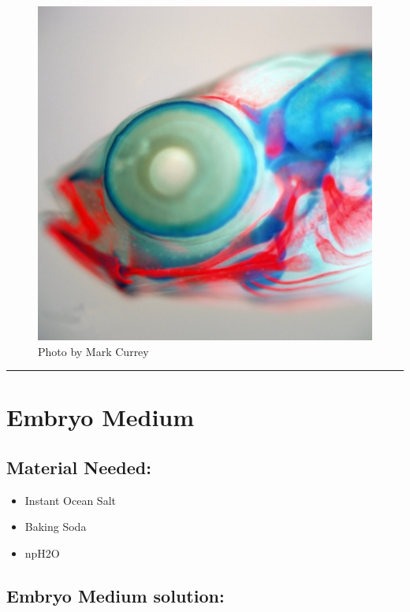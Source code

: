 \documentclass[
]{book}
\providecommand{\tightlist}{%
  \setlength{\itemsep}{0pt}\setlength{\parskip}{0pt}}
\begin{document}
\begin{figure}
\centering
\includegraphics{images/double_head.jpg}
\caption{Photo by Mark Currey}
\end{figure}

\begin{center}\rule{0.5\linewidth}{0.5pt}\end{center}

\hypertarget{embryo-medium}{%
\section{Embryo Medium}\label{embryo-medium}}

\hypertarget{material-needed-2}{%
\subsection{Material Needed:}\label{material-needed-2}}

\begin{itemize}
\tightlist
\item
  Instant Ocean Salt
\item
  Baking Soda
\item
  npH2O
\end{itemize}

\hypertarget{embryo-medium-solution}{%
\subsection{Embryo Medium solution:}\label{embryo-medium-solution}}
\end{document}
